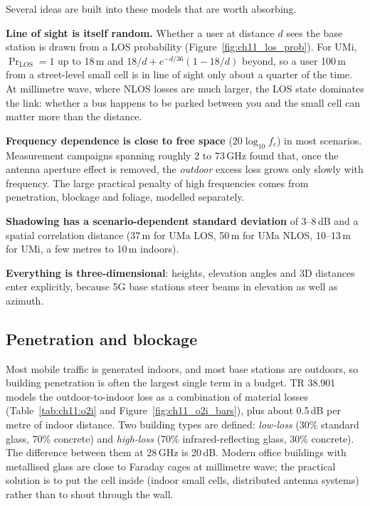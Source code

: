 
Several ideas are built into these models that are worth absorbing.

\textbf{Line of sight is itself random.} Whether a user at distance $d$ sees the base station is
drawn from a LOS probability (Figure~\ref{fig:ch11_los_prob}). For UMi, $\Pr_{\text{LOS}}=1$ up to
18\,m and $18/d+e^{-d/36}(1-18/d)$ beyond, so a user 100\,m from a street-level small cell is in
line of sight only about a quarter of the time. At millimetre wave, where NLOS losses are much
larger, the LOS state dominates the link: whether a bus happens to be parked between you and the
small cell can matter more than the distance.


\textbf{Frequency dependence is close to free space} ($20\log_{10}f_c$) in most scenarios.
Measurement campaigns spanning roughly 2 to 73\,GHz found that, once the antenna aperture effect is
removed, the \emph{outdoor} excess loss grows only slowly with frequency. The large practical
penalty of high frequencies comes from penetration, blockage and foliage, modelled separately.

\textbf{Shadowing has a scenario-dependent standard deviation} of 3--8\,dB and a spatial
correlation distance (37\,m for UMa LOS, 50\,m for UMa NLOS, 10--13\,m for UMi, a few metres to
10\,m indoors).

\textbf{Everything is three-dimensional}: heights, elevation angles and 3D distances enter
explicitly, because 5G base stations steer beams in elevation as well as azimuth.

\subsection{Penetration and blockage}

Most mobile traffic is generated indoors, and most base stations are outdoors, so building
penetration is often the largest single term in a budget. TR 38.901 models the outdoor-to-indoor
loss as a combination of material losses (Table~\ref{tab:ch11:o2i} and
Figure~\ref{fig:ch11_o2i_bars}), plus about 0.5\,dB per metre of indoor distance. Two building types
are defined: \emph{low-loss} (30\% standard glass, 70\% concrete) and \emph{high-loss} (70\%
infrared-reflecting glass, 30\% concrete). The difference between them at 28\,GHz is 20\,dB. Modern
office buildings with metallised glass are close to Faraday cages at millimetre wave; the practical
solution is to put the cell inside (indoor small cells, distributed antenna systems) rather than to
shout through the wall.

